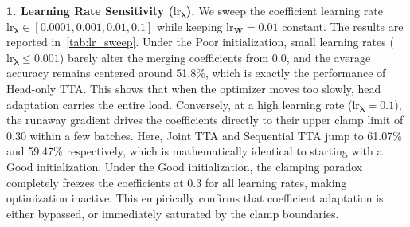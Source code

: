 \documentclass{article}
\theoremstyle{plain}
\theoremstyle{definition}
\theoremstyle{remark}
\begin{document}
\textbf{1. Learning Rate Sensitivity ($\text{lr}_{\boldsymbol{\lambda}}$).} We sweep the coefficient learning rate $\text{lr}_{\boldsymbol{\lambda}} \in [0.0001, 0.001, 0.01, 0.1]$ while keeping $\text{lr}_{\mathbf{W}} = 0.01$ constant. The results are reported in~\cref{tab:lr_sweep}.
Under the Poor initialization, small learning rates ($\text{lr}_{\boldsymbol{\lambda}} \leq 0.001$) barely alter the merging coefficients from $0.0$, and the average accuracy remains centered around 51.8\%, which is exactly the performance of Head-only TTA. This shows that when the optimizer moves too slowly, head adaptation carries the entire load.
Conversely, at a high learning rate ($\text{lr}_{\boldsymbol{\lambda}} = 0.1$), the runaway gradient drives the coefficients directly to their upper clamp limit of $0.30$ within a few batches. Here, Joint TTA and Sequential TTA jump to 61.07\% and 59.47\% respectively, which is mathematically identical to starting with a Good initialization. Under the Good initialization, the clamping paradox completely freezes the coefficients at $0.3$ for all learning rates, making optimization inactive. This empirically confirms that coefficient adaptation is either bypassed, or immediately saturated by the clamp boundaries.
\end{document}
